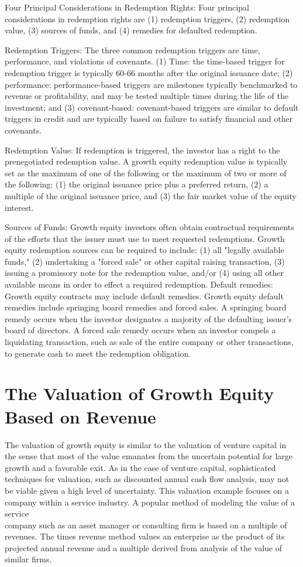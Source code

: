 \documentclass[11pt]{article}
\begin{document}
Four Principal Considerations in Redemption Rights: Four principal considerations in redemption rights are (1) redemption triggers, (2) redemption value, (3) sources of funds, and (4) remedies for defaulted redemption.

Redemption Triggers: The three common redemption triggers are time, performance, and violations of covenants. (1) Time: the time-based trigger for redemption trigger is typically 60-66 months after the original issuance date; (2) performance: performance-based triggers are milestones typically benchmarked to revenue or profitability, and may be tested multiple times during the life of the investment; and (3) covenant-based: covenant-based triggers are similar to default triggers in credit and are typically based on failure to satisfy financial and other covenants.

Redemption Value: If redemption is triggered, the investor has a right to the prenegotiated redemption value. A growth equity redemption value is typically set as the maximum of one of the following or the maximum of two or more of the following: (1) the original issuance price plus a preferred return, (2) a multiple of the original issuance price, and (3) the fair market value of the equity interest.

Sources of Funds: Growth equity investors often obtain contractual requirements of the efforts that the issuer must use to meet requested redemptions. Growth equity redemption sources can be required to include: (1) all "legally available funds," (2) undertaking a "forced sale" or other capital raising transaction, (3) issuing a promissory note for the redemption value, and/or (4) using all other available means in order to effect a required redemption. Default remedies: Growth equity contracts may include default remedies. Growth equity default remedies include springing board remedies and forced sales. A springing board remedy occurs when the investor designates a majority of the defaulting issuer's board of directors. A forced sale remedy occurs when an investor compels a liquidating transaction, such as sale of the entire company or other transactions, to generate cash to meet the redemption obligation.

\section*{The Valuation of Growth Equity Based on Revenue}
The valuation of growth equity is similar to the valuation of venture capital in the sense that most of the value emanates from the uncertain potential for large growth and a favorable exit. As in the case of venture capital, sophisticated techniques for valuation, such as discounted annual cash flow analysis, may not be viable given a high level of uncertainty. This valuation example focuses on a company within a service industry. A popular method of modeling the value of a service\\
company such as an asset manager or consulting firm is based on a multiple of revenues. The times revenue method values an enterprise as the product of its projected annual revenue and a multiple derived from analysis of the value of similar firms.
\end{document}
